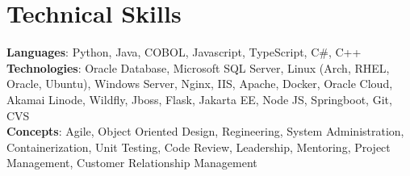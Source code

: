 \section{Technical Skills}
    \begin{itemize}[leftmargin=0.15in, label={}]
	\small{\item{
		\textbf{Languages}{: Python, Java, COBOL, Javascript, TypeScript, C\#, C++} \\
		\textbf{Technologies}{: Oracle Database, Microsoft SQL Server, Linux (Arch, RHEL, Oracle, Ubuntu), Windows Server, Nginx, IIS, Apache, Docker, Oracle Cloud, Akamai Linode, Wildfly, Jboss, Flask, Jakarta EE, Node JS, Springboot, Git, CVS} \\
		\textbf{Concepts}{: Agile, Object Oriented Design, Regineering, System Administration, Containerization, Unit Testing, Code Review, Leadership, Mentoring, Project Management, Customer Relationship Management}
	}}
    \end{itemize}